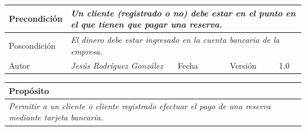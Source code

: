 \begin{table}[H]
\begin{tabular}{llllllll}
    \multicolumn{1}{|l|}{Precondición}                           & \multicolumn{7}{p{10cm}|}{{\color[HTML]{808080} \textit{Un cliente (registrado o no) debe estar en el punto en el que tienen que pagar una reserva.}}}                                                                                                                                                                                                                                   \\ \hline
    \multicolumn{1}{|l|}{Poscondición}                           & \multicolumn{7}{p{10cm}|}{{\color[HTML]{808080} \textit{El dinero debe estar ingresado en la cuenta bancaria de la empresa.}}}                                                                                                                                                                                                                                                       \\ \hline
    \multicolumn{1}{|l|}{Autor}                                  & \multicolumn{1}{l|}{{\color[HTML]{808080} \textit{Jesús Rodríguez González}}}                           & \multicolumn{2}{l|}{Fecha}                                                   & \multicolumn{1}{l|}{}                          & \multicolumn{2}{l|}{Versión}                                                      & \multicolumn{1}{l|}{1.0}                                                     \\ \hline
    \end{tabular}
\end{table}

\begin{table}[H]
    \begin{tabular}{llllllll}
\hline
\multicolumn{8}{|l|}{\cellcolor[HTML]{F2F2F2}Propósito}                                                                                                                                                                                                                                                                                                                                                                                           \\ \hline
\multicolumn{8}{|p{15cm}|}{{\color[HTML]{808080} \textit{Permitir a un cliente o cliente registrado efectuar el pago de una reserva mediante tarjeta bancaria.}}}                                                                                                                                                                                                             \\ \hline
\end{tabular}
\end{table}

